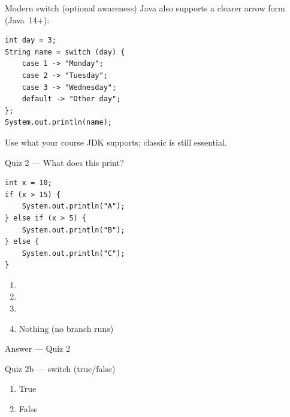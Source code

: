 \documentclass[aspectratio=169,11pt]{beamer}
\begin{document}
    \begin{frame}[fragile]{Modern switch (optional awareness)}
        Java also supports a clearer arrow form (Java~14+):
        \begin{lstlisting}
int day = 3;
String name = switch (day) {
    case 1 -> "Monday";
    case 2 -> "Tuesday";
    case 3 -> "Wednesday";
    default -> "Other day";
};
System.out.println(name);
        \end{lstlisting}
        \vspace{0.3em}
        Use what your course JDK supports; classic  is still essential.
    \end{frame}

    \begin{frame}[fragile]{Quiz 2 --- What does this print?}
        \begin{lstlisting}
int x = 10;
if (x > 15) {
    System.out.println("A");
} else if (x > 5) {
    System.out.println("B");
} else {
    System.out.println("C");
}
        \end{lstlisting}
        \begin{enumerate}
            \item {}
            \item {}
            \item {}
            \item Nothing (no branch runs)
        \end{enumerate}
        \quizpause
    \end{frame}

    \begin{frame}{Answer --- Quiz 2}
    \end{frame}

    \begin{frame}{Quiz 2b --- switch (true/false)}
        \begin{enumerate}
            \item True
            \item False
        \end{enumerate}
        \quizpause
    \end{frame}
\end{document}

